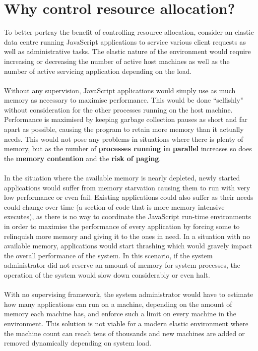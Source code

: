 \documentclass{l4proj}
\begin{document}
\section{Why control resource allocation?}

\hspace*{1em} To better portray the benefit of controlling resource allocation, consider an elastic data centre running JavaScript applications to service various client requests as well as administrative tasks. The elastic nature of the environment would require increasing or decreasing the number of active host machines as well as the number of active servicing application depending on the load. 
\\\\
\hspace*{1em} Without any supervision, JavaScript applications would simply use as much memory as necessary to maximise performance. This would be done ``selfishly'' without consideration for the other processes running on the host machine. Performance is maximised by keeping garbage collection pauses as short and far apart as possible, causing the program to retain more memory than it actually needs. This would not pose any problems in situations where there is plenty of memory, but as the number of \textbf{processes running in parallel} increases so does the \textbf{memory contention} and the \textbf{risk of paging}.
\\\\
\hspace*{1em} In the situation where the available memory is nearly depleted, newly started applications would suffer from memory starvation causing them to run with very low performance or even fail. Existing applications could also suffer as their needs could change over time (a section of code that is more memory intensive executes), as there is no way to coordinate the JavaScript run-time environments in order to maximise the performance of every application by forcing some to relinquish more memory and giving it to the ones in need. In a situation with no available memory, applications would start thrashing which would gravely impact the overall performance of the system. In this scenario, if the system administrator did not reserve an amount of memory for system processes, the operation of the system would slow down considerably or even halt. 
\\\\
\hspace*{1em} With no supervising framework, the system administrator would have to estimate how many applications can run on a machine, depending on the amount of memory each machine has, and enforce such a limit on every machine in the environment. This solution is not viable for a modern elastic environment where the machine count can reach tens of thousands and new machines are added or removed dynamically depending on system load. 
\end{document}
